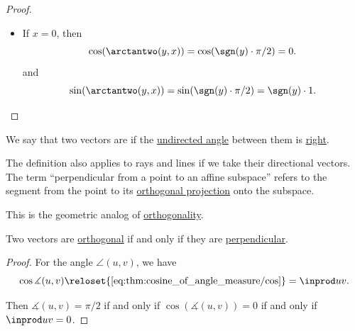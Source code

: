 \begin{proof}
\begin{itemize}
    \item If \( x = 0 \), then
    \begin{equation*}
      \cos(\arctantwo(y, x)) = \cos(\sgn(y) \cdot \pi / 2) = 0.
    \end{equation*}
    and
    \begin{equation*}
      \sin(\arctantwo(y, x)) = \sin(\sgn(y) \cdot \pi / 2) = \sgn(y) \cdot 1.
    \end{equation*}
  \end{itemize}
\end{proof}

\begin{definition}\label{def:perpendicularity}\mimprovised
  We say that two vectors are  if the \hyperref[def:angle/undirected]{undirected angle} between them is \hyperref[def:angle/measure/right]{right}.

  \begin{thmenum}
     The definition also applies to rays and lines if we take their directional vectors.
     The term \enquote{perpendicular from a point to an affine subspace} refers to the segment from the point to its \hyperref[def:orthogonal_projection]{orthogonal projection} onto the subspace.
  \end{thmenum}
\end{definition}
\begin{comments}
  \item This is the geometric analog of \hyperref[def:orthogonality]{orthogonality}.
\end{comments}

\begin{proposition}\label{thm:perpendicular_iff_orthogonal}
  Two vectors are \hyperref[def:orthogonality]{orthogonal} if and only if they are \hyperref[def:perpendicularity/directional]{perpendicular}.
\end{proposition}
\begin{proof}
  For the angle \( \angle(u, v) \), we have
  \begin{equation*}
    \cos \measuredangle(u, v)
    \reloset {\eqref{eq:thm:cosine_of_angle_measure/cos}} =
    \inprod u v.
  \end{equation*}

  Then \( \measuredangle(u, v) = \pi / 2 \) if and only if \( \cos(\measuredangle(u, v)) = 0 \) if and only if \( \inprod u v = 0 \).
\end{proof}

